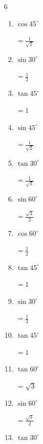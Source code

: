 \begin{multicols}{6}
\begin{enumerate}
        $\displaystyle =\frac{1}{2}$

  \item $\displaystyle \cos{45^\circ}$

        $\displaystyle =\frac{1}{\sqrt{2}}$

  \item $\displaystyle \sin{30^\circ}$

        $\displaystyle =\frac{1}{2}$

  \item $\displaystyle \tan{45^\circ}$

        $\displaystyle =1$

  \item $\displaystyle \sin{45^\circ}$

        $\displaystyle =\frac{1}{\sqrt{2}}$

  \item $\displaystyle \tan{30^\circ}$

        $\displaystyle =\frac{1}{\sqrt{3}}$

  \item $\displaystyle \sin{60^\circ}$

        $\displaystyle =\frac{\sqrt{3}}{2}$

\columnbreak %

\resetques

  \item $\displaystyle \cos{60^\circ}$

        $\displaystyle =\frac{1}{2}$

  \item $\displaystyle \tan{45^\circ}$

        $\displaystyle =1$

  \item $\displaystyle \sin{30^\circ}$

        $\displaystyle =\frac{1}{2}$

  \item $\displaystyle \tan{45^\circ}$

        $\displaystyle =1$

  \item $\displaystyle \tan{60^\circ}$

        $\displaystyle =\sqrt{3}$

  \item $\displaystyle \sin{60^\circ}$

        $\displaystyle =\frac{\sqrt{3}}{2}$

  \item $\displaystyle \tan{30^\circ}$


\end{enumerate}
\end{multicols}
